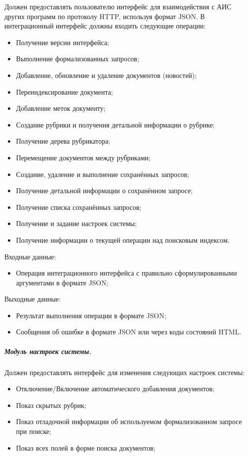 Должен предоставлять пользователю интерфейс для взаимодействия с АИС других программ по протоколу HTTP, используя формат JSON. В интеграционный интерфейс должны входить следующие операции:
\begin{itemize}
\item Получение версии интерфейса;
\item Выполнение формализованных запросов;
\item Добавление, обновление и удаление документов (новостей);
\item Переиндексирование документа;
\item Добавление меток документу;
\item Создание рубрики и получения детальной информации о рубрике;
\item Получение дерева рубрикатора;
\item Перемещение документов между рубриками;
\item Создание, удаление и выполнение сохранённых запросов;
\item Получение детальной информации о сохранённом запросе;
\item Получение списка сохранённых запросов;
\item Получение и задание настроек системы;
\item Получение информации о текущей операции над поисковым индексом.
\end{itemize}

Входные данные:
\begin{itemize}
\item Операция интеграционного интерфейса с правильно сформулированными аргументами в формате JSON;
\end{itemize}

Выходные данные:
\begin{itemize}
\item Результат выполнения операции в формате JSON;
\item Сообщения об ошибке в формате JSON или через коды состояний HTML.
\end{itemize}

\subparagraph{Модуль настроек системы.} \hfill

Должен предоставлять интерфейс для изменения следующих настроек системы:
\begin{itemize}
\item Отключение/Включение автоматического добавления документов;
\item Показ скрытых рубрик;
\item Показ отладочной информации об используемом формализованном запросе при поиске;
\item Показ всех полей в форме поиска документов;
\end{itemize}

